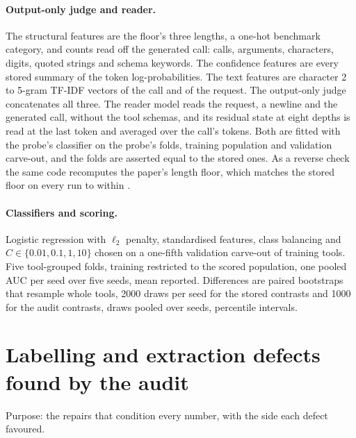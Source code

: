 \paragraph{Output-only judge and reader.} The structural features are the floor's three lengths, a one-hot benchmark category, and counts read off the generated call: calls, arguments, characters, digits, quoted strings and schema keywords. The confidence features are every stored summary of the token log-probabilities. The text features are character 2 to 5-gram TF-IDF vectors of the call and of the request. The output-only judge concatenates all three. The reader model \readerName{} reads the request, a newline and the generated call, without the tool schemas, and its residual state at eight depths is read at the last token and averaged over the call's tokens. Both are fitted with the probe's classifier on the probe's folds, training population and validation carve-out, and the folds are asserted equal to the stored ones. As a reverse check the same code recomputes the paper's length floor, which matches the stored floor on every run to within \floorReproMaxDiff{}.

\paragraph{Classifiers and scoring.} Logistic regression with $\ell_2$ penalty, standardised features, class balancing and $C \in \{0.01, 0.1, 1, 10\}$ chosen on a one-fifth validation carve-out of training tools. Five tool-grouped folds, training restricted to the scored population, one pooled AUC per seed over five seeds, mean reported. Differences are paired bootstraps that resample whole tools, 2000 draws per seed for the stored contrasts and 1000 for the audit contrasts, draws pooled over seeds, percentile intervals.

\section{Labelling and extraction defects found by the audit}
\label{app:audit}

Purpose: the repairs that condition every number, with the side each defect favoured.

